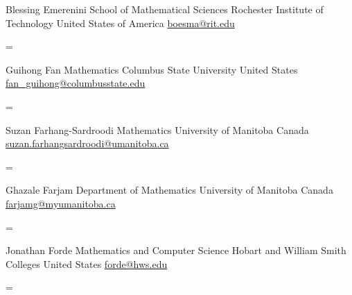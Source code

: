 \documentclass[
  letterpaper,
  DIV=11,
  numbers=noendperiod]{scrartcl}
\newenvironment{absolutelynopagebreak}
  {\par\nobreak\vfil\penalty0\vfilneg
   \vtop\bgroup}
  {\par\xdef\tpd{\the\prevdepth}\egroup
   \prevdepth=\tpd}
\begin{document}
\begin{absolutelynopagebreak}Blessing   Emerenini \newline
\mbox{}\quad  School of Mathematical Sciences \newline
\mbox{}\quad  Rochester Institute of Technology \newline
\mbox{}\quad  United States of America \newline
\mbox{}\quad \href{mailto: boesma@rit.edu }{ boesma@rit.edu }
\end{absolutelynopagebreak}\vskip0.2cm
\begin{absolutelynopagebreak}Guihong   Fan \newline
\mbox{}\quad  Mathematics \newline
\mbox{}\quad  Columbus State University \newline
\mbox{}\quad  United States \newline
\mbox{}\quad \href{mailto: fan\_guihong@columbusstate.edu }{ fan\_guihong@columbusstate.edu }
\end{absolutelynopagebreak}\vskip0.2cm
\begin{absolutelynopagebreak}Suzan   Farhang-Sardroodi \newline
\mbox{}\quad  Mathematics \newline
\mbox{}\quad  University of Manitoba \newline
\mbox{}\quad  Canada \newline
\mbox{}\quad \href{mailto: suzan.farhangsardroodi@umanitoba.ca }{ suzan.farhangsardroodi@umanitoba.ca }
\end{absolutelynopagebreak}\vskip0.2cm
\begin{absolutelynopagebreak}Ghazale   Farjam \newline
\mbox{}\quad  Department of Mathematics \newline
\mbox{}\quad  University of Manitoba \newline
\mbox{}\quad  Canada \newline
\mbox{}\quad \href{mailto: farjamg@myumanitoba.ca }{ farjamg@myumanitoba.ca }
\end{absolutelynopagebreak}\vskip0.2cm
\begin{absolutelynopagebreak}Jonathan   Forde \newline
\mbox{}\quad  Mathematics and Computer Science \newline
\mbox{}\quad  Hobart and William Smith Colleges \newline
\mbox{}\quad  United States \newline
\mbox{}\quad \href{mailto: forde@hws.edu }{ forde@hws.edu }
\end{absolutelynopagebreak}\vskip0.2cm
\end{document}
